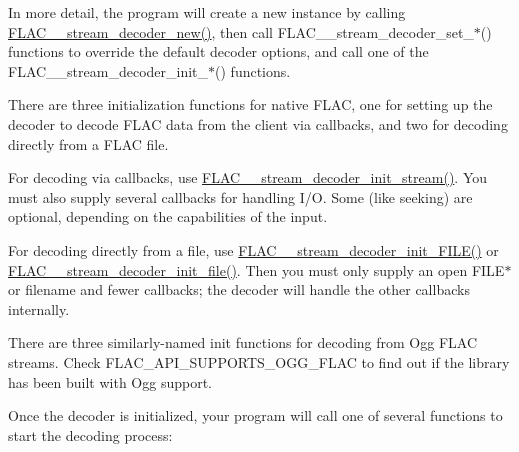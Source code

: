 In more detail, the program will create a new instance by calling \hyperlink{group__flac__stream__decoder_ga7159eefc074dfbab4a37462f69326091}{F\+L\+A\+C\+\_\+\+\_\+stream\+\_\+decoder\+\_\+new()}, then call F\+L\+A\+C\+\_\+\+\_\+stream\+\_\+decoder\+\_\+set\+\_\+$\ast$() functions to override the default decoder options, and call one of the F\+L\+A\+C\+\_\+\+\_\+stream\+\_\+decoder\+\_\+init\+\_\+$\ast$() functions.

There are three initialization functions for native F\+L\+AC, one for setting up the decoder to decode F\+L\+AC data from the client via callbacks, and two for decoding directly from a F\+L\+AC file.

For decoding via callbacks, use \hyperlink{group__flac__stream__decoder_ga32c28a56a2bdfa2333edbd3d991894d7}{F\+L\+A\+C\+\_\+\+\_\+stream\+\_\+decoder\+\_\+init\+\_\+stream()}. You must also supply several callbacks for handling I/O. Some (like seeking) are optional, depending on the capabilities of the input.

For decoding directly from a file, use \hyperlink{group__flac__stream__decoder_ga38f9eb46bf112af205f86b4cbac9980c}{F\+L\+A\+C\+\_\+\+\_\+stream\+\_\+decoder\+\_\+init\+\_\+\+F\+I\+L\+E()} or \hyperlink{group__flac__stream__decoder_ga1692108a97012d1c5f79baf7df012c33}{F\+L\+A\+C\+\_\+\+\_\+stream\+\_\+decoder\+\_\+init\+\_\+file()}. Then you must only supply an open {\ttfamily F\+I\+L\+E$\ast$} or filename and fewer callbacks; the decoder will handle the other callbacks internally.

There are three similarly-\/named init functions for decoding from Ogg F\+L\+AC streams. Check {\ttfamily F\+L\+A\+C\+\_\+\+A\+P\+I\+\_\+\+S\+U\+P\+P\+O\+R\+T\+S\+\_\+\+O\+G\+G\+\_\+\+F\+L\+AC} to find out if the library has been built with Ogg support.

Once the decoder is initialized, your program will call one of several functions to start the decoding process\+:



